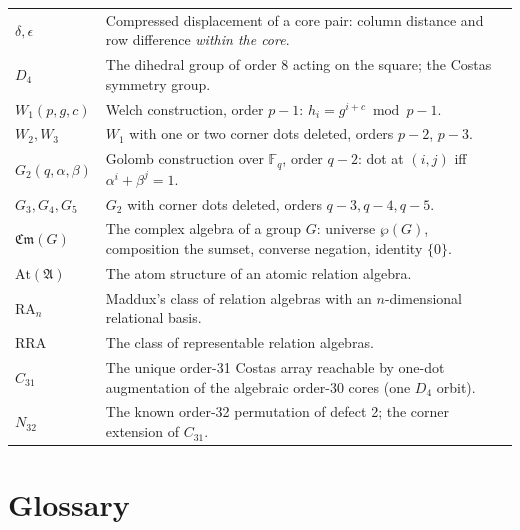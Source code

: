 \documentclass[11pt,a4paper]{article}
\theoremstyle{definition}
\newcommand{\F}{\mathbb{F}}
\newcommand{\Cm}{\mathfrak{Cm}}
\newcommand{\RA}{\mathrm{RA}}
\newcommand{\RRA}{\mathrm{RRA}}
\newcommand{\At}{\mathrm{At}}
\begin{document}
\begin{longtable}{@{}l p{}@{}}
$\delta,\epsilon$ & Compressed displacement of a core pair: column distance and
      row difference \emph{within the core}. \\
$D_4$ & The dihedral group of order 8 acting on the square; the Costas
      symmetry group. \\
$W_1(p,g,c)$ & Welch construction, order $p-1$: $h_i = g^{i+c}\bmod p - 1$. \\
$W_2,W_3$ & $W_1$ with one or two corner dots deleted, orders $p-2$, $p-3$. \\
$G_2(q,\alpha,\beta)$ & Golomb construction over $\F_q$, order $q-2$:
      dot at $(i,j)$ iff $\alpha^i+\beta^j=1$. \\
$G_3,G_4,G_5$ & $G_2$ with corner dots deleted, orders $q-3,q-4,q-5$. \\
$\Cm(G)$ & The complex algebra of a group $G$: universe $\wp(G)$, composition
      the sumset, converse negation, identity $\{0\}$. \\
$\At(\mathfrak A)$ & The atom structure of an atomic relation algebra. \\
$\RA_n$ & Maddux's class of relation algebras with an $n$-dimensional
      relational basis. \\
$\RRA$ & The class of representable relation algebras. \\
$C_{31}$ & The unique order-31 Costas array reachable by one-dot augmentation
      of the algebraic order-30 cores (one $D_4$ orbit). \\
$N_{32}$ & The known order-32 permutation of defect 2; the corner extension of
      $C_{31}$. \\
\bottomrule
\end{longtable}

\section{Glossary}
\label{sec:glossary}
\end{document}
